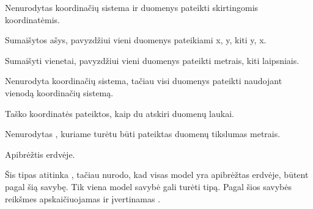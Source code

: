 \documentclass[letterpaper,10pt,lithuanian]{sphinxmanual}
\begin{document}
\begin{fulllineitems}
\begin{sphinxShadowBox}
\begin{description}
\sphinxAtStartPar
Nenurodytas koordinačių sistema ir duomenys pateikti skirtingomis
koordinatėmis.

\sphinxAtStartPar
Sumaišytos ašys, pavyzdžiui vieni duomenys pateikiami x, y, kiti y,
x.

\sphinxAtStartPar
Sumaišyti vienetai, pavyzdžiui vieni duomenys pateikti metrais,
kiti laipsniais.

\sphinxAtStartPar
Nenurodyta koordinačių sistema, tačiau visi duomenys pateikti
naudojant vienodą koordinačių sistemą.

\sphinxAtStartPar
Taško koordinatės pateiktos, kaip du atskiri duomenų laukai.

\sphinxAtStartPar
Nenurodytas {\hyperref[\detokenize{dimensijos:property.ref}]{}}, kuriame turėtu būti pateiktas
duomenų tikslumas metrais.

\end{description}
\end{sphinxShadowBox}

\end{fulllineitems}



\begin{fulllineitems}

\pysigstartsignatures
{}
\pysigstopsignatures
\sphinxAtStartPar
{}

\sphinxAtStartPar
Apibrėžtis erdvėje.

\sphinxAtStartPar
Šis tipas atitinka , tačiau nurodo, kad visas model yra
apibrėžtas erdvėje, būtent pagal šią savybę.  Tik viena model savybė
gali turėti  tipą. Pagal šios savybės reikšmes apskaičiuojamas ir
įvertinamas .

\end{fulllineitems}
\end{document}
